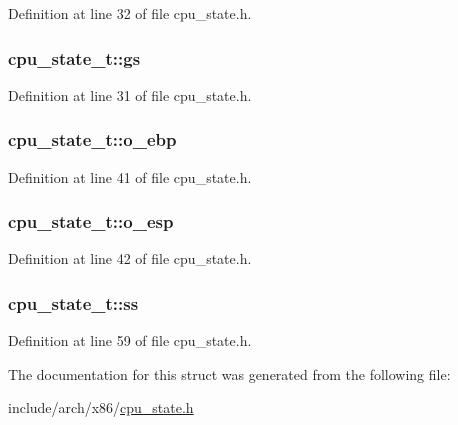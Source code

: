 \-Definition at line 32 of file cpu\-\_\-state.\-h.

\hypertarget{structcpu__state__t_a3c275c66dae874b988318f370e37c57c}{
\subsubsection[{gs}]{ {\bf cpu\-\_\-state\-\_\-t\-::gs}}}\label{structcpu__state__t_a3c275c66dae874b988318f370e37c57c}


\-Definition at line 31 of file cpu\-\_\-state.\-h.

\hypertarget{structcpu__state__t_a655550b9a94213fbf44a1331891ca824}{
\subsubsection[{o\-\_\-ebp}]{ {\bf cpu\-\_\-state\-\_\-t\-::o\-\_\-ebp}}}\label{structcpu__state__t_a655550b9a94213fbf44a1331891ca824}


\-Definition at line 41 of file cpu\-\_\-state.\-h.

\hypertarget{structcpu__state__t_a168ec183f497b544b52993eb20bbf649}{
\subsubsection[{o\-\_\-esp}]{ {\bf cpu\-\_\-state\-\_\-t\-::o\-\_\-esp}}}\label{structcpu__state__t_a168ec183f497b544b52993eb20bbf649}


\-Definition at line 42 of file cpu\-\_\-state.\-h.

\hypertarget{structcpu__state__t_a59aecceee8d4468f6daed1980f6fa565}{
\subsubsection[{ss}]{ {\bf cpu\-\_\-state\-\_\-t\-::ss}}}\label{structcpu__state__t_a59aecceee8d4468f6daed1980f6fa565}


\-Definition at line 59 of file cpu\-\_\-state.\-h.



\-The documentation for this struct was generated from the following file\-:\begin{DoxyCompactItemize}
\item 
include/arch/x86/\hyperlink{cpu__state_8h}{cpu\-\_\-state.\-h}\end{DoxyCompactItemize}
